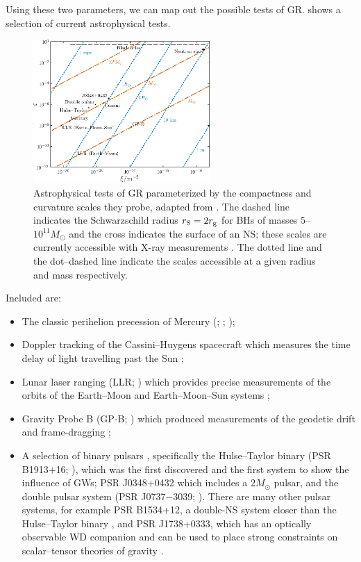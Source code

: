 Using these two parameters, we can map out the possible tests of GR.  shows a selection of current astrophysical tests.
\begin{figure}
  \centering
  \includegraphics[width=0.6\textwidth]{./images/Fig_Psaltis_plot}
    \caption{Astrophysical tests of GR parameterized by the compactness and curvature scales they probe, adapted from \citet{Psaltis2008a}. The dashed line indicates the Schwarzschild radius $r_\mathrm{S} = 2 r_\mathrm{g}$ for BHs of masses $5$--$10^{11} M_\odot$ and the cross indicates the surface of an NS; these scales are currently accessible with X-ray measurements \citep[e.g.,][]{Miller2007, McClintock2011}. The dotted line and the dot--dashed line indicate the scales accessible at a given radius and mass respectively.}  
    \label{fig:Psaltis} 
\end{figure}
Included are:
\begin{itemize}
\item The classic perihelion precession of Mercury (\citealt[section 10.2]{Hobson2006}; \citealt[section 7.3]{Will1993}; \citealt{Pitjeva2013});
\item Doppler tracking of the Cassini--Huygens spacecraft \citep{Bertotti2003} which measures the time delay of light travelling past the Sun \citep[section 7.2]{Will1993};
\item Lunar laser ranging (LLR; \citealt{Bender1973,Williams2012}) which provides precise measurements of the orbits of the Earth--Moon and Earth--Moon--Sun systems \citep[section 8.1]{Will1993};
\item Gravity Probe B (GP-B; \citealt{Everitt2009,Everitt2011}) which produced measurements of the geodetic drift and frame-dragging \citep[section 9.1]{Will1993};
\item A selection of binary pulsars \citep{Taylor1993,Stairs2003}, specifically the Hulse--Taylor binary (PSR B1913$+$16; \citealt{Hulse1975,Weisberg2010}), which was the first discovered and the first system to show the influence of GWs; PSR J0348$+$0432 \citep{Antoniadis2013} which includes a $2 M_\odot$ pulsar, and the double pulsar system (PSR J0737$-$3039; \citealt{Breton2008,Kramer2008}). There are many other pulsar systems, for example PSR B1534+12, a double-NS system closer than the Hulse--Taylor binary \citep{Stairs2002}, and PSR J1738+0333, which has an optically observable WD companion \citep{Antoniadis2012} and can be used to place strong constraints on scalar--tensor theories of gravity \citep{Freire2012}.
\end{itemize}
